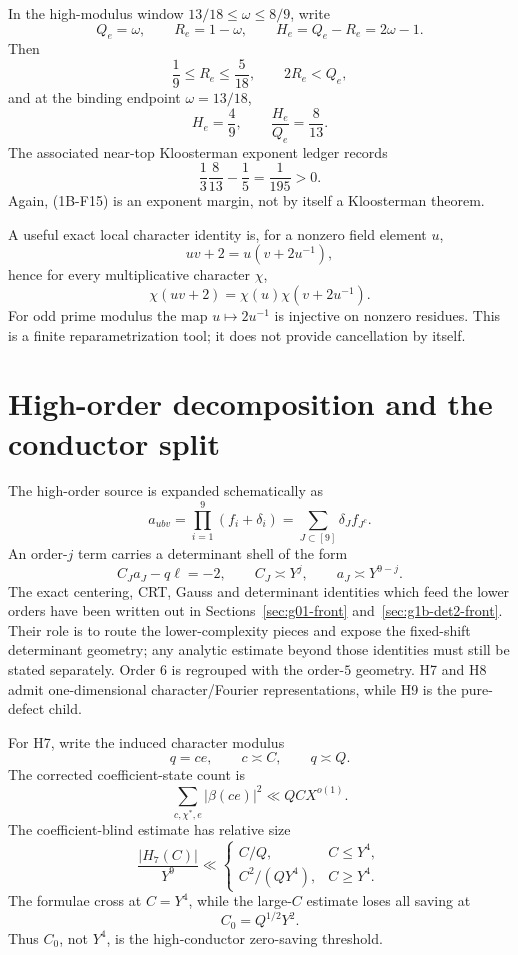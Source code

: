 \documentclass[11pt]{article}
\theoremstyle{definition}
\theoremstyle{remark}
\newcommand{\1}{\mathbf 1}
\begin{document}
In the high-modulus window $13/18\le\omega\le8/9$, write
\[
 Q_e=\omega,\qquad R_e=1-\omega,
\qquad H_e=Q_e-R_e=2\omega-1.
\tag{1B-F12}
\]
Then
\[
 \frac19\le R_e\le\frac5{18},\qquad 2R_e<Q_e,
\tag{1B-F13}
\]
and at the binding endpoint $\omega=13/18$,
\[
 H_e=\frac49,
 \qquad
 \frac{H_e}{Q_e}=\frac8{13}.
\tag{1B-F14}
\]
The associated near-top Kloosterman exponent ledger records
\[
 \frac13\frac8{13}-\frac15=\frac1{195}>0.
\tag{1B-F15}
\]
Again, (1B-F15) is an exponent margin, not by itself a Kloosterman theorem.

A useful exact local character identity is, for a nonzero field element $u$,
\[
 uv+2=u\left(v+2u^{-1}\right),
\tag{1B-F16}
\]
hence for every multiplicative character $\chi$,
\[
 \boxed{\chi(uv+2)=\chi(u)\chi(v+2u^{-1}).}
\tag{1B-F17}
\]
For odd prime modulus the map $u\mapsto2u^{-1}$ is injective on nonzero residues.  This is a finite
reparametrization tool; it does not provide cancellation by itself.


\section{High-order decomposition and the conductor split}

The high-order source is expanded schematically as
\[
 a_{ubv}=\prod_{i=1}^9(f_i+\delta_i)
 =\sum_{J\subset[9]}\delta_Jf_{J^c}.
\tag{1B-exp}
\]
An order-$j$ term carries a determinant shell of the form
\[
 C_Ja_J-q\ell=-2,
 \qquad C_J\asymp Y^j,
 \qquad a_J\asymp Y^{9-j}.
\tag{1B-shell}
\]
The exact centering, CRT, Gauss and determinant identities which feed the lower orders have been written out in
Sections~\ref{sec:g01-front} and~\ref{sec:g1b-det2-front}.  Their role is to route the lower-complexity pieces
and expose the fixed-shift determinant geometry; any analytic estimate beyond those identities must still be
stated separately.  Order $6$ is regrouped with the order-$5$ geometry.  H7 and H8 admit one-dimensional
character/Fourier representations, while H9 is the pure-defect child.

For H7, write the induced character modulus
\[
 q=ce,
 \qquad c\asymp C,
 \qquad q\asymp Q.
\]
The corrected coefficient-state count is
\[
 \sum_{c,\chi^*,e}|\beta(ce)|^2\ll QCX^{o(1)}.
\tag{1B-state}
\]
The coefficient-blind estimate has relative size
\[
 \frac{|H_7(C)|}{Y^9}\ll
 \begin{cases}
 C/Q,&C\le Y^4,\\[1mm]
 C^2/(QY^4),&C\ge Y^4.
 \end{cases}
\tag{1B-blind}
\]
The formulae cross at $C=Y^4$, while the large-$C$ estimate loses all saving at
\[
 \boxed{C_0=Q^{1/2}Y^2.}
\tag{1B-C0}
\]
Thus $C_0$, not $Y^4$, is the high-conductor zero-saving threshold.
\end{document}
